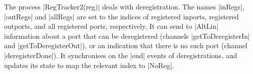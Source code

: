 





The process |RegTracker2(reg)| deals with deregistration.  The names |inRegs|,
|outRegs| and |allRegs| are set to the indices of registered inports,
registered outports, and all registered ports, respectively.  It can send to
|AltLin| information about a port that can be deregistered (channels
|getToDeregisterIn| and |getToDeregisterOut|), or an indication that there is
no such port (channel |deregisterDone|).  It synchronises on the |end| events of
deregistrations, and updates its state to map the relevant index to |NoReg|.

